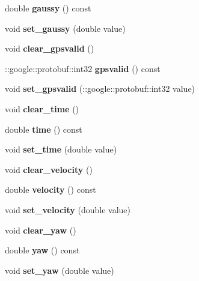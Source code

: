 \begin{DoxyCompactItemize}
\mbox{\label{class_i_m_u_1_1_imu_a395aabee16a0720b51420f862fd8aa7a}} 
double {\bfseries gaussy} () const
\item 
\mbox{\label{class_i_m_u_1_1_imu_a8c257fe8f523b45ad4fa25356b710524}} 
void {\bfseries set\+\_\+gaussy} (double value)
\item 
\mbox{\label{class_i_m_u_1_1_imu_a4b71f4580e2dfd5183cca6f928c65196}} 
void {\bfseries clear\+\_\+gpsvalid} ()
\item 
\mbox{\label{class_i_m_u_1_1_imu_ad77e1064d6698bee89b191114151fc6a}} 
\+::google\+::protobuf\+::int32 {\bfseries gpsvalid} () const
\item 
\mbox{\label{class_i_m_u_1_1_imu_a9d8d4c4865dd47366ebcd0df5d05455d}} 
void {\bfseries set\+\_\+gpsvalid} (\+::google\+::protobuf\+::int32 value)
\item 
\mbox{\label{class_i_m_u_1_1_imu_aee7b8a67326d336de5c344c9d5b4d81b}} 
void {\bfseries clear\+\_\+time} ()
\item 
\mbox{\label{class_i_m_u_1_1_imu_af55740c988e4b381c3772eedb4287142}} 
double {\bfseries time} () const
\item 
\mbox{\label{class_i_m_u_1_1_imu_a386f11cd6d276cf19358a9d8b3534420}} 
void {\bfseries set\+\_\+time} (double value)
\item 
\mbox{\label{class_i_m_u_1_1_imu_a16065faaeb83c27a243a510e4fa25948}} 
void {\bfseries clear\+\_\+velocity} ()
\item 
\mbox{\label{class_i_m_u_1_1_imu_a717f7bfcc1837d083c0d2c0d25f9533d}} 
double {\bfseries velocity} () const
\item 
\mbox{\label{class_i_m_u_1_1_imu_ae158fe86b5376b3e6fe816b14a3faabe}} 
void {\bfseries set\+\_\+velocity} (double value)
\item 
\mbox{\label{class_i_m_u_1_1_imu_ac08f52b9f2fb24803d0f2b2f90d890fc}} 
void {\bfseries clear\+\_\+yaw} ()
\item 
\mbox{\label{class_i_m_u_1_1_imu_a57cbaa33a5be678464975aa30b26ca32}} 
double {\bfseries yaw} () const
\item 
\mbox{\label{class_i_m_u_1_1_imu_a0b08f743c111c180e96722deeb0846c5}} 
void {\bfseries set\+\_\+yaw} (double value)
\end{DoxyCompactItemize}
